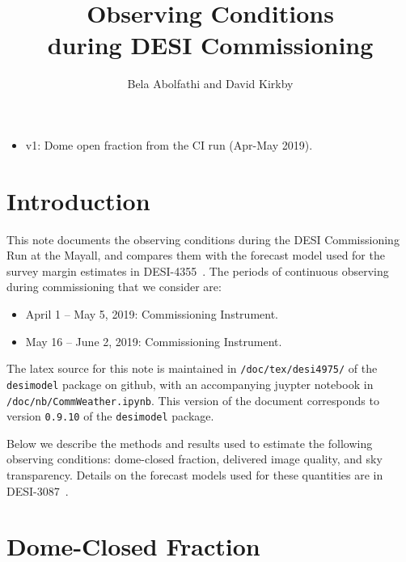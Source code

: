 \documentclass[12pt]{article}
\title{Observing Conditions\\
during DESI Commissioning\\
\vspace{5mm}{\large\bf DESI-doc-4975-v1}}
\author{Bela Abolfathi and David Kirkby}
\begin{document}
\maketitle

\begin{itemize}
    \item v1: Dome open fraction from the CI run (Apr-May 2019).
\end{itemize}

\section{Introduction}

This note documents the observing conditions during the DESI Commissioning Run at the Mayall, and compares them
with the forecast model used for the survey margin estimates in DESI-4355~\cite{desi-4355}.
The periods of continuous observing during commissioning that we consider are:
\begin{itemize}
\item April 1 -- May 5, 2019: Commissioning Instrument.
\item May 16 -- June 2, 2019: Commissioning Instrument.
\end{itemize}

The latex source for this note is maintained in {\tt /doc/tex/desi4975/} of the {\tt desimodel} package on github,
with an accompanying juypter notebook in {\tt /doc/nb/CommWeather.ipynb}. This version of the document corresponds to
version {\tt 0.9.10} of the {\tt desimodel} package.

Below we describe the methods and results used to estimate the following observing conditions: dome-closed fraction,
delivered image quality, and sky transparency.  Details on the forecast models used for these quantities are in
DESI-3087~\cite{desi-3087}.

\section{Dome-Closed Fraction}
\end{document}

